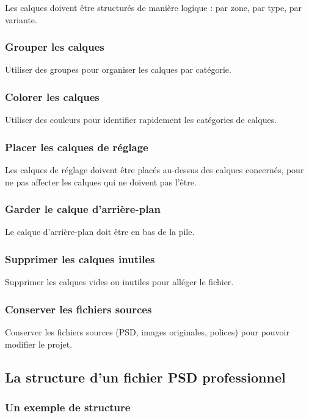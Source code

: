 Les calques doivent être structurés de manière logique : par zone, par type, par variante.

\subsubsection{Grouper les calques}

Utiliser des groupes pour organiser les calques par catégorie.

\subsubsection{Colorer les calques}

Utiliser des couleurs pour identifier rapidement les catégories de calques.

\subsubsection{Placer les calques de réglage}

Les calques de réglage doivent être placés au-dessus des calques concernés, pour ne pas affecter les calques qui ne doivent pas l'être.

\subsubsection{Garder le calque d'arrière-plan}

Le calque d'arrière-plan doit être en bas de la pile.

\subsubsection{Supprimer les calques inutiles}

Supprimer les calques vides ou inutiles pour alléger le fichier.

\subsubsection{Conserver les fichiers sources}

Conserver les fichiers sources (PSD, images originales, polices) pour pouvoir modifier le projet.

\subsection{La structure d'un fichier PSD professionnel}

\subsubsection{Un exemple de structure}


